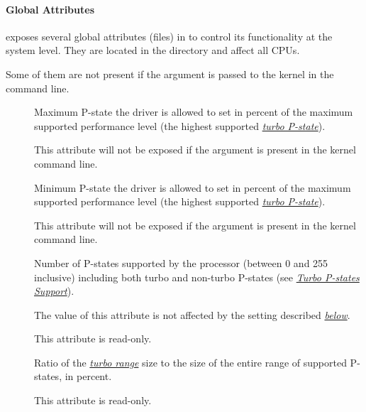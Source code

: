 \documentclass[a4paper,8pt,english]{sphinxmanual}
\begin{document}
\paragraph{Global Attributes}
\label{admin-guide/pm/intel_pstate:global-attributes}
 exposes several global attributes (files) in  to
control its functionality at the system level.  They are located in the
 directory and affect all
CPUs.

Some of them are not present if the 
argument is passed to the kernel in the command line.
\begin{description}
\item[{}] \leavevmode
Maximum P-state the driver is allowed to set in percent of the
maximum supported performance level (the highest supported {\hyperref[admin\string-guide/pm/intel_pstate:turbo]{\emph{turbo
P-state}}}\label{admin-guide/pm/intel_pstate:turbo}).

This attribute will not be exposed if the
 argument is present in the kernel
command line.

\item[{}] \leavevmode
Minimum P-state the driver is allowed to set in percent of the
maximum supported performance level (the highest supported {\hyperref[admin\string-guide/pm/intel_pstate:turbo]{\emph{turbo
P-state}}}\label{admin-guide/pm/intel_pstate:turbo}).

This attribute will not be exposed if the
 argument is present in the kernel
command line.

\item[{}] \leavevmode
Number of P-states supported by the processor (between 0 and 255
inclusive) including both turbo and non-turbo P-states (see
{\hyperref[admin\string-guide/pm/intel_pstate:turbo\string-p\string-states\string-support]{\emph{Turbo P-states Support}}}).

The value of this attribute is not affected by the 
setting described {\hyperref[admin\string-guide/pm/intel_pstate:no\string-turbo\string-attr]{\emph{below}}}\label{admin-guide/pm/intel_pstate:no-turbo-attr}.

This attribute is read-only.

\item[{}] \leavevmode
Ratio of the {\hyperref[admin\string-guide/pm/intel_pstate:turbo]{\emph{turbo range}}}\label{admin-guide/pm/intel_pstate:turbo} size to the size of the entire
range of supported P-states, in percent.

This attribute is read-only.

\end{description}
\end{document}

